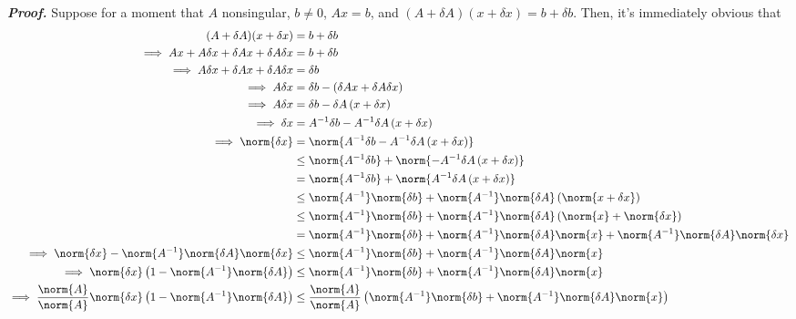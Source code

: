 \documentclass{report}
\begin{document}
\begin{itemize}
        \bigbreak \noindent 
        \textbf{\textit{Proof.}} Suppose for a moment that $A$ nonsingular, $b\ne 0$, $Ax= b$, and $(A + \delta A)(x + \delta x) = b + \delta b$. Then, it's immediately obvious that
        \begin{align*}
            (A+\delta A)(x + \delta x) &= b + \delta b \\
            \implies Ax + A\delta x + \delta Ax + \delta A \delta x &= b + \delta b\\
            \implies A\delta x + \delta Ax + \delta A \delta x &= \delta b\\
            \implies A\delta x &= \delta b - (\delta Ax + \delta A \delta x) \\
            \implies A\delta x &= \delta b - \delta A\left(x + \delta x\right) \\
            \implies \delta x &= A^{-1} \delta b - A^{-1}\delta A\left(x+\delta x\right) \\
            \implies \norm{\delta x} &= \norm{A^{-1}\delta b -A^{-1}\delta A\left(x + \delta x\right)} \\
                                     &\leq\norm{A^{-1}\delta b} + \norm{-A^{-1} \delta A\left(x + \delta x\right)} \\
                                     &=\norm{A^{-1}\delta b} + \norm{A^{-1} \delta A\left(x + \delta x\right)}  \\
                                     &\leq \norm{A^{-1}}\norm{\delta b} + \norm{A^{-1}}\norm{\delta A}\left(\norm{x + \delta x}\right) \\
                                     &\leq \norm{A^{-1}}\norm{\delta b} + \norm{A^{-1}}\norm{\delta A}\left(\norm{x} + \norm{\delta x}\right) \\
                                     &=\norm{A^{-1}}\norm{\delta b} + \norm{A^{-1}}\norm{\delta A}\norm{x} + \norm{A^{-1}}\norm{\delta A}\norm{\delta x} \\
            \implies \norm{\delta x} - \norm{A^{-1}}\norm{\delta A}\norm{\delta x} &\leq \norm{A^{-1}}\norm{\delta b} + \norm{A^{-1}}\norm{\delta A}\norm{x} \\
            \implies \norm{\delta x}\left(1-\norm{A^{-1}}\norm{\delta A}\right) &\leq \norm{A^{-1}}\norm{\delta b} + \norm{A^{-1}}\norm{\delta A}\norm{x} \\
            \implies \frac{\norm{A}}{\norm{A}}\norm{\delta x} \left(1-\norm{A^{-1}}\norm{\delta A}\right) &\leq \frac{\norm{A}}{\norm{A}}\left(\norm{A^{-1}}\norm{\delta b} + \norm{A^{-1}}\norm{\delta A}\norm{x}\right) \\

\end{align*}
\end{itemize}
\end{document}
